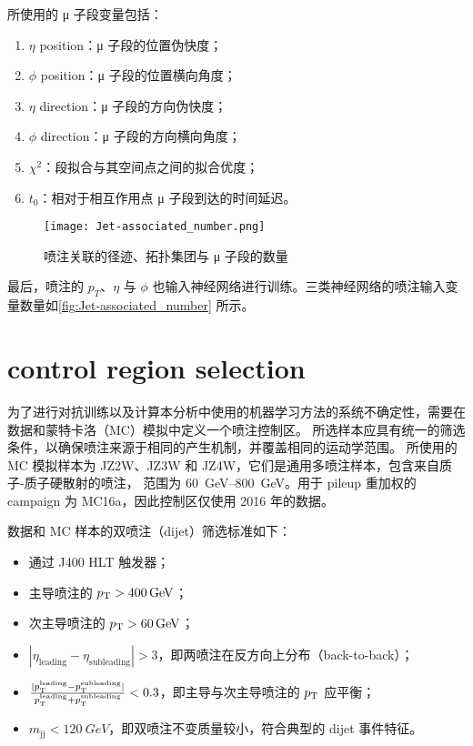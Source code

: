 所使用的 μ 子段变量包括：
\begin{enumerate}
      \item $\eta$ position：μ 子段的位置伪快度；
      \item $\phi$ position：μ 子段的位置横向角度；
      \item $\eta$ direction：μ 子段的方向伪快度；
      \item $\phi$ direction：μ 子段的方向横向角度；
      \item $\chi^2$：段拟合与其空间点之间的拟合优度；
      \item $t_0$：相对于相互作用点 μ 子段到达的时间延迟。
\end{enumerate}

\begin{figure}[ht]
      \centering
      \texttt{[image: Jet-associated\_number.png]}
      \caption{喷注关联的径迹、拓扑集团与 μ 子段的数量}
      \label{fig:Jet-associated_number}
\end{figure}

最后，喷注的 $p_T$、$\eta$ 与 $\phi$ 也输入神经网络进行训练。三类神经网络的喷注输入变量数量如\autoref{fig:Jet-associated_number} 所示。


\section{control region selection}
为了进行对抗训练以及计算本分析中使用的机器学习方法的系统不确定性，需要在数据和蒙特卡洛（MC）模拟中定义一个喷注控制区。
所选样本应具有统一的筛选条件，以确保喷注来源于相同的产生机制，并覆盖相同的运动学范围。
所使用的 MC 模拟样本为 JZ2W、JZ3W 和 JZ4W，它们是通用多喷注样本，包含来自质子-质子硬散射的喷注，
\pt 范围为 \SI{60}{GeV}--\SI{800}{GeV}。用于 pileup 重加权的 campaign 为 MC16a，因此控制区仅使用 2016 年的数据。

数据和 MC 样本的双喷注（dijet）筛选标准如下：
\begin{itemize}
  \item 通过 J400 HLT 触发器；
  \item 主导喷注的 $p_{\text{T}} > \SI{400}{GeV}$；
  \item 次主导喷注的 $p_{\text{T}} > \SI{60}{GeV}$；
  \item $|\eta_{\text{leading}} - \eta_{\text{subleading}}| > 3$，即两喷注在反方向上分布（back-to-back）；
  \item $\frac{|p_{\text{T}}^{\text{leading}} - p_{\text{T}}^{\text{subleading}}|}{p_{\text{T}}^{\text{leading}} + p_{\text{T}}^{\text{subleading}}} < 0.3$，即主导与次主导喷注的 $p_{\text{T}}$ 应平衡；
  \item $m_{\text{jj}} < \SI{120}{GeV}$，即双喷注不变质量较小，符合典型的 dijet 事件特征。
\end{itemize}

